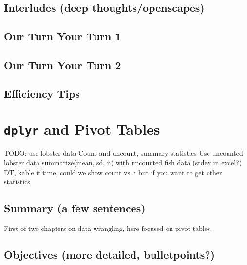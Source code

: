 \documentclass[]{book}
\begin{document}
\hypertarget{interludes-deep-thoughtsopenscapes-4}{%
\section{Interludes (deep thoughts/openscapes)}\label{interludes-deep-thoughtsopenscapes-4}}

\hypertarget{our-turn-your-turn-1-1}{%
\section{Our Turn Your Turn 1}\label{our-turn-your-turn-1-1}}

\hypertarget{our-turn-your-turn-2-1}{%
\section{Our Turn Your Turn 2}\label{our-turn-your-turn-2-1}}

\hypertarget{efficiency-tips-4}{%
\section{Efficiency Tips}\label{efficiency-tips-4}}

\hypertarget{pivot}{%
\chapter{\texorpdfstring{\texttt{dplyr} and Pivot Tables}{dplyr and Pivot Tables}}\label{pivot}}

TODO:
use lobster data
Count and uncount, summary statistics
Use uncounted lobster data
summarize(mean, sd, n) with uncounted fish data (stdev in excel?)
DT, kable
if time, could we show count vs n but if you want to get other statistics

\hypertarget{summary-a-few-sentences-4}{%
\section{Summary (a few sentences)}\label{summary-a-few-sentences-4}}

First of two chapters on data wrangling, here focused on pivot tables.

\hypertarget{objectives-more-detailed-bulletpoints-2}{%
\section{Objectives (more detailed, bulletpoints?)}\label{objectives-more-detailed-bulletpoints-2}}
\end{document}
